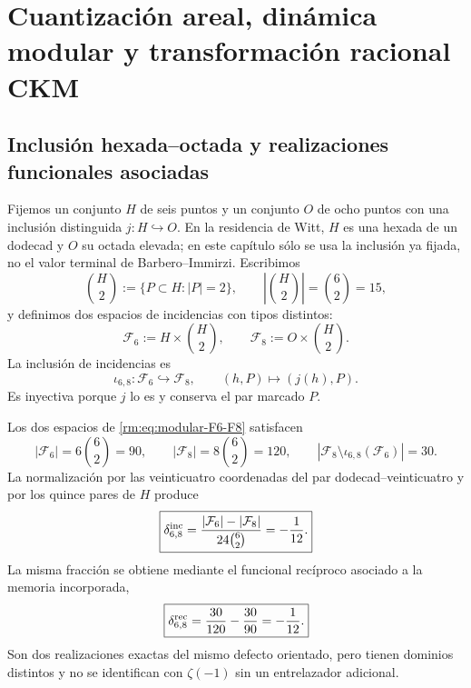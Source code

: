 \section{Cuantizaci\'on areal, din\'amica modular y transformaci\'on racional CKM}
\label{rm:ch:modular}

\subsection{Inclusi\'on hexada--octada y realizaciones funcionales asociadas}

Fijemos un conjunto \(H\) de seis puntos y un conjunto \(O\) de ocho
puntos con una inclusi\'on distinguida \(j:H\hookrightarrow O\). En la
residencia de Witt, \(H\) es una hexada de un dodecad y \(O\) su octada
elevada; en este cap\'itulo s\'olo se usa la inclusi\'on ya fijada, no el
valor terminal de Barbero--Immirzi. Escribimos
\begin{equation}
\label{rm:eq:modular-pairs-H}
\binom H2:=\{P\subset H:|P|=2\},
\qquad \left|\binom H2\right|=\binom62=15,
\end{equation}
y definimos dos espacios de incidencias con tipos distintos:
\begin{equation}
\label{rm:eq:modular-F6-F8}
\mathcal F_6:=H\times\binom H2,
\qquad
\mathcal F_8:=O\times\binom H2.
\end{equation}
La inclusi\'on de incidencias es
\begin{equation}
\label{rm:eq:modular-iota68}
\iota_{6,8}:\mathcal F_6\hookrightarrow\mathcal F_8,
\qquad
(h,P)\longmapsto(j(h),P).
\end{equation}
Es inyectiva porque \(j\) lo es y conserva el par marcado \(P\).

\begin{theorem}
\label{rm:thm:modular-incidence-90-120}
Los dos espacios de \cref{rm:eq:modular-F6-F8} satisfacen
\begin{equation}
\label{rm:eq:modular-counts-90-120}
|\mathcal F_6|=6\binom62=90,
\qquad
|\mathcal F_8|=8\binom62=120,
\qquad
|\mathcal F_8\setminus\iota_{6,8}(\mathcal F_6)|=30.
\end{equation}
La normalizaci\'on por las veinticuatro coordenadas del par
dodecad--veinticuatro y por los quince pares de \(H\) produce
\begin{equation}
\label{rm:eq:modular-incidence-defect}
\boxed{
\delta_{6,8}^{\rm inc}
=\frac{|\mathcal F_6|-|\mathcal F_8|}
{24\binom62}=-\frac1{12}.}
\end{equation}
La misma fracci\'on se obtiene mediante el funcional rec\'iproco asociado
a la memoria incorporada,
\begin{equation}
\label{rm:eq:modular-reciprocal-defect}
\boxed{
\delta_{6,8}^{\rm rec}
=\frac{30}{120}-\frac{30}{90}=-\frac1{12}.}
\end{equation}
Son dos realizaciones exactas del mismo defecto orientado, pero tienen
dominios distintos y no se identifican con \(\zeta(-1)\) sin un
entrelazador adicional.
\end{theorem}

